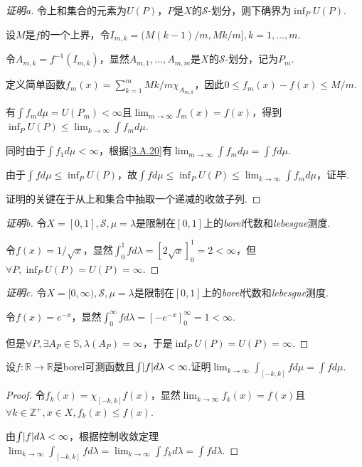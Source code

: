 \begin{proof}[证明a]
    令上和集合的元素为\(U(P)\)，\(P\)是\(X\)的\(\mathcal{S}\)-划分，则下确界为\(\inf_P U(P)\).

    设\(M\)是\(f\)的一个上界，令\(I_{m,k}=(M(k-1)/m, Mk/m], k=1, \dots, m\).

    令\(A_{m,k}=f^{-1}(I_{m,k})\)，显然\(A_{m,1}, \dots, A_{m,m}\)是\(X\)的\(\mathcal{S}\)-划分，记为\(P_m\).

    定义简单函数\(f_m(x)=\sum_{k=1}^m Mk/m \chi_{A_{m,k}}\)，因此\(0 \leq f_m(x)-f(x) \leq M/m\).

    有\(\int f_m d\mu=U(P_m)<\infty\)且\(\lim_{m \to \infty} f_m(x)=f(x)\)，得到\(\inf_P U(P) \leq \lim_{k \to \infty} \int f_m d\mu\).

    同时由于\(\int f_1 d\mu<\infty\)，根据\cref{3.A.20}有\(\lim_{m \to \infty} \int f_m d\mu=\int f d\mu\).

    由于\(\int f d\mu \leq \inf_P U(P)\)，故\(\int f d\mu \leq \inf_P U(P) \leq \lim_{k \to \infty} \int f_m d\mu\)，证毕.

    {\kaishu 证明的关键在于从上和集合中抽取一个递减的收敛子列.}
\end{proof}

\begin{proof}[证明b]
    令\(X=[0,1], \mathcal{S}, \mu=\lambda\)是限制在\([0,1]\)上的\textit{borel}代数和\textit{lebesgue}测度.

    令\(f(x)=1/\sqrt{x}\)，显然\(\int_0^1 f d\lambda=[2\sqrt{x}]_0^1=2<\infty\)，但\(\forall P, \inf_P U(P)=U(P)=\infty\).
\end{proof}

\begin{proof}[证明c]
    令\(X=[0,\infty), \mathcal{S}, \mu=\lambda\)是限制在\([0,1]\)上的\textit{borel}代数和\textit{lebesgue}测度.

    令\(f(x)=e^{-x}\)，显然\(\int_0^\infty f d\lambda=[-e^{-x}]_0^\infty=1<\infty\).

    但是\(\forall P, \exists A_P \in \mathbb{S}, \lambda(A_P)=\infty\)，于是\(\inf_P U(P)=U(P)=\infty\).
\end{proof}

\begin{problem}[5]\label{3.B.5}
    设\(f: \mathbb{R} \to \mathbb{R}\)是borel可测函数且\(\int \abs*{f} d\lambda<\infty\).证明\(\lim_{k \to \infty} \int_{[-k,k]} f d\mu=\int f d\mu\).
\end{problem}

\begin{proof}
    令\(f_k(x)=\chi_{[-k,k]} f(x)\)，显然\(\lim_{k \to \infty}f_k(x)=f(x)\)且\(\forall k \in \mathbb{Z}^+, x \in X, f_k(x) \leq f(x)\).

    由\(\int \abs*{f} d\lambda<\infty\)，根据控制收敛定理\(\lim_{k \to \infty} \int_{[-k,k]} f d\lambda=\lim_{k \to \infty} \int f_k d\lambda=\int f d\lambda\).
\end{proof}

